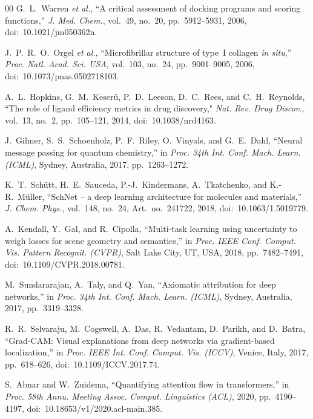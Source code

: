 \documentclass[11pt]{article}
\begin{document}
\begin{thebibliography}{00}
G.~L.~Warren \emph{et al.}, ``A critical assessment of docking programs and
scoring functions,'' \emph{J. Med. Chem.}, vol.~49, no.~20,
pp.~5912--5931, 2006, doi:~10.1021/jm050362n.

J.~P.~R.~O.~Orgel \emph{et al.}, ``Microfibrillar structure of type~I
collagen \emph{in situ},'' \emph{Proc. Natl. Acad. Sci. USA}, vol.~103,
no.~24, pp.~9001--9005, 2006, doi:~10.1073/pnas.0502718103.

A.~L.~Hopkins, G.~M.~Keser\"u, P.~D.~Leeson, D.~C.~Rees, and
C.~H.~Reynolds, ``The role of ligand efficiency metrics in drug discovery,"
\emph{Nat. Rev. Drug Discov.}, vol.~13, no.~2, pp.~105--121, 2014,
doi:~10.1038/nrd4163.

J.~Gilmer, S.~S.~Schoenholz, P.~F.~Riley, O.~Vinyals, and G.~E.~Dahl,
``Neural message passing for quantum chemistry,'' in \emph{Proc. 34th
Int. Conf. Mach. Learn. (ICML)}, Sydney, Australia, 2017, pp.~1263--1272.

K.~T.~Sch\"{u}tt, H.~E.~Sauceda, P.-J.~Kindermans, A.~Tkatchenko, and
K.-R.~M\"{u}ller, ``SchNet -- a deep learning architecture for molecules
and materials,'' \emph{J. Chem. Phys.}, vol.~148, no.~24,
Art.~no.~241722, 2018, doi:~10.1063/1.5019779.

A.~Kendall, Y.~Gal, and R.~Cipolla, ``Multi-task learning using
uncertainty to weigh losses for scene geometry and semantics,'' in
\emph{Proc. IEEE Conf. Comput. Vis. Pattern Recognit. (CVPR)},
Salt Lake City, UT, USA, 2018, pp.~7482--7491,
doi:~10.1109/CVPR.2018.00781.

M.~Sundararajan, A.~Taly, and Q.~Yan, ``Axiomatic attribution for deep
networks,'' in \emph{Proc. 34th Int. Conf. Mach. Learn. (ICML)},
Sydney, Australia, 2017, pp.~3319--3328.

R.~R.~Selvaraju, M.~Cogswell, A.~Das, R.~Vedantam, D.~Parikh, and
D.~Batra, ``Grad-CAM: Visual explanations from deep networks via
gradient-based localization,'' in \emph{Proc. IEEE Int. Conf. Comput.
Vis. (ICCV)}, Venice, Italy, 2017, pp.~618--626,
doi:~10.1109/ICCV.2017.74.

S.~Abnar and W.~Zuidema, ``Quantifying attention flow in transformers,''
in \emph{Proc. 58th Annu. Meeting Assoc. Comput. Linguistics (ACL)},
2020, pp.~4190--4197, doi:~10.18653/v1/2020.acl-main.385.

\end{thebibliography}
\end{document}
